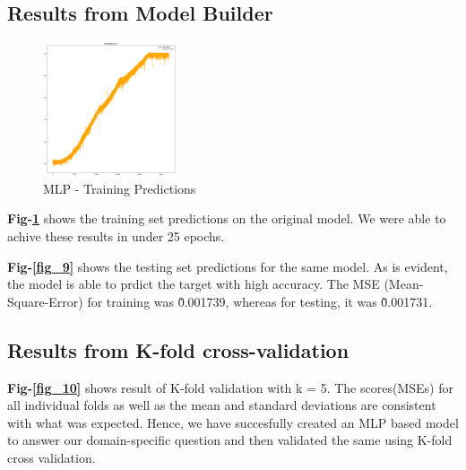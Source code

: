 \documentclass[conference]{IEEEtran}
\begin{document}
{	\subsection{\textbf{Results from Model Builder}}
        \vspace{-3mm}
        
		\begin{figure}[!h]
	            \centering
	            \includegraphics[width=0.35\textwidth]{../Data_Mining_Images/Train_Predictions.png}
	            \caption{MLP - Training Predictions} \label{fig_8}
	        \end{figure}

	       	\textbf{Fig-\ref{fig_8}} shows the training set predictions on the original model. We were able to achive these results in under 25 epochs.
		
		\textbf{Fig-\ref{fig_9}} shows the testing set predictions for the same model. As is evident, the model is able to prdict the target with high accuracy.
		The MSE (Mean-Square-Error) for training was \~ 0.001739, whereas for testing, it was  \~ 0.001731.

  \subsection{\textbf{Results from K-fold cross-validation}}
		\textbf{Fig-\ref{fig_10}} shows result of K-fold validation with k = 5. The scores(MSEs) for all individual folds as well as the mean and standard deviations are consistent with what was expected. Hence, we have succesfully created an MLP based model to answer our domain-specific question and then validated the same using K-fold cross validation.

}
\end{document}
